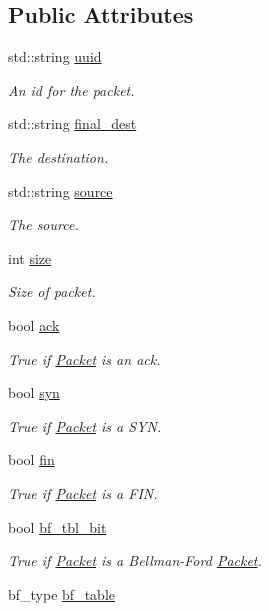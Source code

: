 \subsection*{\-Public \-Attributes}
\begin{DoxyCompactItemize}
\item 
std\-::string \hyperlink{classPacket_acaefdb9f910265a1ff97b522a780f088}{uuid}
\begin{DoxyCompactList}\small\item\em \-An id for the packet. \end{DoxyCompactList}\item 
std\-::string \hyperlink{classPacket_a14d18bd9829ec1951730bc8bbadb570d}{final\-\_\-dest}
\begin{DoxyCompactList}\small\item\em \-The destination. \end{DoxyCompactList}\item 
std\-::string \hyperlink{classPacket_a9fdc30310ed4a548f4a51dc6c79442d9}{source}
\begin{DoxyCompactList}\small\item\em \-The source. \end{DoxyCompactList}\item 
int \hyperlink{classPacket_ad6c10fc808850949cd3f9b9a2ff018d5}{size}
\begin{DoxyCompactList}\small\item\em \-Size of packet. \end{DoxyCompactList}\item 
bool \hyperlink{classPacket_a1824b08ed28de1f329146d082b6d0dee}{ack}
\begin{DoxyCompactList}\small\item\em \-True if \hyperlink{classPacket}{\-Packet} is an ack. \end{DoxyCompactList}\item 
bool \hyperlink{classPacket_ad27cb1ca949aa1dece5a14d0cc734a8e}{syn}
\begin{DoxyCompactList}\small\item\em \-True if \hyperlink{classPacket}{\-Packet} is a \-S\-Y\-N. \end{DoxyCompactList}\item 
bool \hyperlink{classPacket_a2143fa46561ca6d5f5edd8678602ef6c}{fin}
\begin{DoxyCompactList}\small\item\em \-True if \hyperlink{classPacket}{\-Packet} is a \-F\-I\-N. \end{DoxyCompactList}\item 
bool \hyperlink{classPacket_ab3bb221061fb274a23f041e4b5e93ce7}{bf\-\_\-tbl\-\_\-bit}
\begin{DoxyCompactList}\small\item\em \-True if \hyperlink{classPacket}{\-Packet} is a \-Bellman-\/\-Ford \hyperlink{classPacket}{\-Packet}. \end{DoxyCompactList}\item 
\hypertarget{classPacket_ad19b836a6a6deab55ec66cb333642a5e}{bf\-\_\-type \hyperlink{classPacket_ad19b836a6a6deab55ec66cb333642a5e}{bf\-\_\-table}}\label{classPacket_ad19b836a6a6deab55ec66cb333642a5e}


\end{DoxyCompactItemize}

